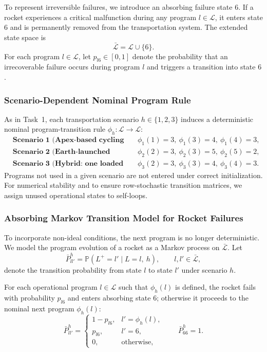 ﻿\documentclass{mcmthesis}
\begin{document}
To represent irreversible failures, we introduce an absorbing failure state $6$.
If a rocket experiences a critical malfunction during any program $l\in\mathcal{L}$, it enters state $6$ and is
permanently removed from the transportation system. The extended state space is
\[
\bar{\mathcal{L}}=\mathcal{L}\cup\{6\}.
\]
For each program $l\in\mathcal{L}$, let $p_{l6}\in[0,1]$ denote the probability that an irrecoverable failure
occurs during program $l$ and triggers a transition into state $6$.

\subsubsection{Scenario-Dependent Nominal Program Rule}
\label{sec:model2_phi}

As in Task~1, each transportation scenario $h\in\{1,2,3\}$ induces a deterministic nominal program-transition
rule $\phi_h:\mathcal{L}\to \mathcal{L}$:
\begin{align*}
&\textbf{Scenario 1 (Apex-based cycling after deployment):} &&
\phi_1(1)=3,\ \phi_1(3)=4,\ \phi_1(4)=3,\\
&\textbf{Scenario 2 (Earth-launched cycling):} &&
\phi_2(2)=3,\ \phi_2(3)=5,\ \phi_2(5)=2,\\
&\textbf{Scenario 3 (Hybrid: one loaded Earth launch then Apex cycling):} &&
\phi_3(2)=3,\ \phi_3(3)=4,\ \phi_3(4)=3.
\end{align*}
Programs not used in a given scenario are not entered under correct initialization. For numerical stability and
to ensure row-stochastic transition matrices, we assign unused operational states to self-loops.

\subsubsection{Absorbing Markov Transition Model for Rocket Failures}
\label{sec:model2_markov}

To incorporate non-ideal conditions, the next program is no longer deterministic.
We model the program evolution of a rocket as a Markov process on $\bar{\mathcal{L}}$.
Let
\[
\bar P^{h}_{ll'}=\mathbb{P}(L^{+}=l'\mid L=l,\ h),\qquad l,l'\in\bar{\mathcal{L}},
\]
denote the transition probability from state $l$ to state $l'$ under scenario $h$.

For each operational program $l\in\mathcal{L}$ such that $\phi_h(l)$ is defined, the rocket fails with probability
$p_{l6}$ and enters absorbing state $6$; otherwise it proceeds to the nominal next program $\phi_h(l)$:
\[
\bar P^{h}_{ll'}=
\begin{cases}
1-p_{l6}, & l'=\phi_h(l),\\
p_{l6},   & l'=6,\\
0,        & \text{otherwise},
\end{cases}
\qquad
\bar P^{h}_{66}=1.
\]
\end{document}
